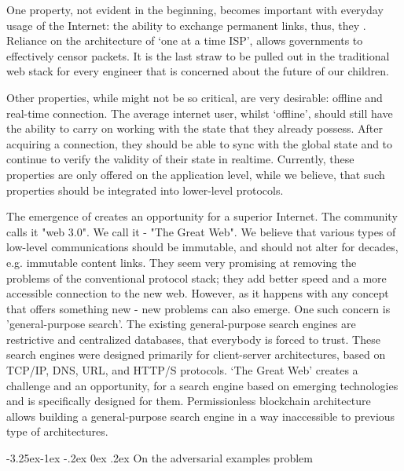\documentclass[8pt,oneside]{amsart}
\makeatletter
\newcommand{\linkgreen}[2]{\href{#1}{\color{green}{#2}}}
\renewcommand\subsection{\@startsection{subsection}{2}{\z@}%
                                     {-3.25ex\@plus -1ex \@minus -.2ex}%
                                     {0ex \@plus .2ex}%
                                     {\play\Large}}%
\newcommand{\titleSection}[1]{\subsection{#1}}
\makeatother
\begin{document}
\begin{Abstract}
One property, not evident in the beginning, becomes important with everyday usage of the Internet: the ability to exchange permanent links, thus, they \linkgreen{https://ipfs.io/ipfs/QmNhaUrhM7KcWzFYdBeyskoNyihrpHvUEBQnaddwPZigcN}{would not break, after time had passed}. Reliance on the architecture of ‘one at a time ISP’, allows governments to effectively censor packets. It is the last straw to be pulled out in the traditional web stack for every engineer that is concerned about the future of our children.

Other properties, while might not be so critical, are very desirable: offline and real-time connection. The average internet user, whilst ‘offline’, should still have the ability to carry on working with the state that they already possess. After acquiring a connection, they should be able to sync with the global state and to continue to verify the validity of their state in realtime. Currently, these properties are only offered on the application level, while we believe, that such properties should be integrated into lower-level protocols.

The emergence of \linkgreen{https://ipfs.io/ipfs/Qmf3eHU9idMUZgx6MKhCsFPWL24X9pDUi2ECqyH8UtBAMQ}{a brand-new web-stack} creates an opportunity for a superior Internet. The community calls it "web 3.0". We call it - "The Great Web". We believe that various types of low-level communications should be immutable, and should not alter for decades, e.g. immutable content links. They seem very promising at removing the problems of the conventional protocol stack; they add better speed and a more accessible connection to the new web. However, as it happens with any concept that offers something new - new problems can also emerge. One such concern is 'general-purpose search'. The existing general-purpose search engines are restrictive and centralized databases, that everybody is forced to trust. These search engines were designed primarily for client-server architectures, based on TCP/IP, DNS, URL, and HTTP/S protocols. ‘The Great Web’ creates a challenge and an opportunity, for a search engine based on emerging technologies and is specifically designed for them. Permissionless blockchain architecture allows building a general-purpose search engine in a way inaccessible to previous type of architectures.

\titleSection{On the adversarial examples problem}\label{On the adversarial examples problem}


\end{Abstract}
\end{document}
